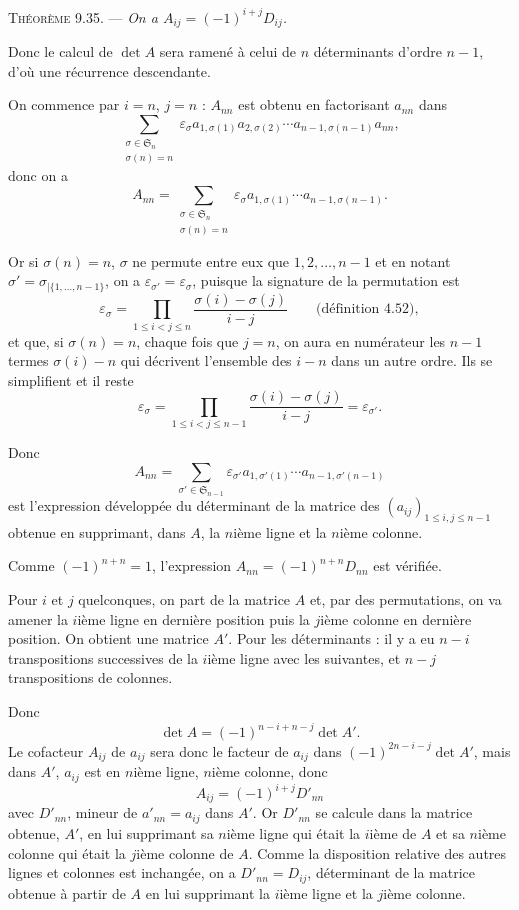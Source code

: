 \medskip\noindent\textsc{Théorème 9.35.} --- \emph{On a $A_{ij}=(-1)^{i+j}D_{ij}$.}

Donc le calcul de $\det A$ sera ramené à celui de $n$ déterminants d'ordre $n-1$, d'où une récurrence descendante.

On commence par $i=n$, $j=n$ : $A_{nn}$ est obtenu en factorisant $a_{nn}$ dans
\[
\sum_{\substack{\sigma\in\mathfrak S_n\\\sigma(n)=n}}
\varepsilon_\sigma a_{1,\sigma(1)}a_{2,\sigma(2)}\cdots a_{n-1,\sigma(n-1)}a_{nn},
\]
donc on a
\[
A_{nn}=\sum_{\substack{\sigma\in\mathfrak S_n\\\sigma(n)=n}}
\varepsilon_\sigma a_{1,\sigma(1)}\cdots a_{n-1,\sigma(n-1)}.
\]

Or si $\sigma(n)=n$, $\sigma$ ne permute entre eux que $1,2,\ldots,n-1$ et en notant $\sigma'=\sigma_{|\{1,\ldots,n-1\}}$, on a $\varepsilon_{\sigma'}=\varepsilon_\sigma$, puisque la signature de la permutation est
\[
\varepsilon_\sigma=\prod_{1\le i<j\le n}\frac{\sigma(i)-\sigma(j)}{i-j}
\qquad\text{(définition 4.52)},
\]
et que, si $\sigma(n)=n$, chaque fois que $j=n$, on aura en numérateur les $n-1$ termes $\sigma(i)-n$ qui décrivent l'ensemble des $i-n$ dans un autre ordre. Ils se simplifient et il reste
\[
\varepsilon_\sigma=\prod_{1\le i<j\le n-1}\frac{\sigma(i)-\sigma(j)}{i-j}=\varepsilon_{\sigma'}.
\]

Donc
\[
A_{nn}=\sum_{\sigma'\in\mathfrak S_{n-1}}\varepsilon_{\sigma'}
 a_{1,\sigma'(1)}\cdots a_{n-1,\sigma'(n-1)}
\]
est l'expression développée du déterminant de la matrice des $(a_{ij})_{1\le i,j\le n-1}$ obtenue en supprimant, dans $A$, la $n$ième ligne et la $n$ième colonne.

Comme $(-1)^{n+n}=1$, l'expression $A_{nn}=(-1)^{n+n}D_{nn}$ est vérifiée.

Pour $i$ et $j$ quelconques, on part de la matrice $A$ et, par des permutations, on va amener la $i$ième ligne en dernière position puis la $j$ième colonne en dernière position. On obtient une matrice $A'$. Pour les déterminants : il y a eu $n-i$ transpositions successives de la $i$ième ligne avec les suivantes, et $n-j$ transpositions de colonnes.

Donc
\[
\det A=(-1)^{n-i+n-j}\det A'.
\]
Le cofacteur $A_{ij}$ de $a_{ij}$ sera donc le facteur de $a_{ij}$ dans $(-1)^{2n-i-j}\det A'$, mais dans $A'$, $a_{ij}$ est en $n$ième ligne, $n$ième colonne, donc
\[
A_{ij}=(-1)^{i+j}D'_{nn}
\]
avec $D'_{nn}$, mineur de $a'_{nn}=a_{ij}$ dans $A'$. Or $D'_{nn}$ se calcule dans la matrice obtenue, $A'$, en lui supprimant sa $n$ième ligne qui était la $i$ième de $A$ et sa $n$ième colonne qui était la $j$ième colonne de $A$. Comme la disposition relative des autres lignes et colonnes est inchangée, on a $D'_{nn}=D_{ij}$, déterminant de la matrice obtenue à partir de $A$ en lui supprimant la $i$ième ligne et la $j$ième colonne.

